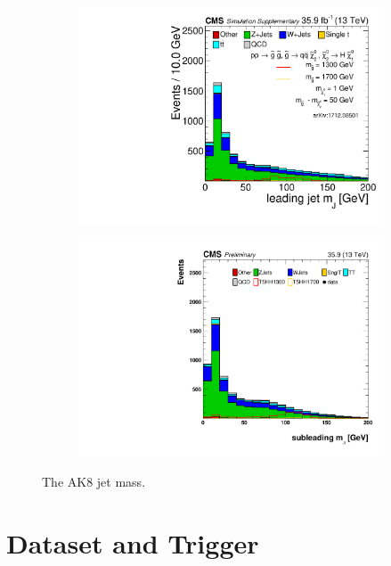 \begin{figure}
\begin{subfigure}[b]{0.5\textwidth}
\centering
\includegraphics[width=\textwidth]{figs/SUS17006/J1Mwide_JetPt.pdf}
\end{subfigure}
\begin{subfigure}[b]{0.5\textwidth}
\centering
\includegraphics[width=\textwidth]{figs/SUS17006/J2Mwide_JetPt.pdf} 
\end{subfigure}
\caption{The AK8 jet mass.}
\label{fig:ak8mass}
\end{figure}

\section{Dataset and Trigger}

